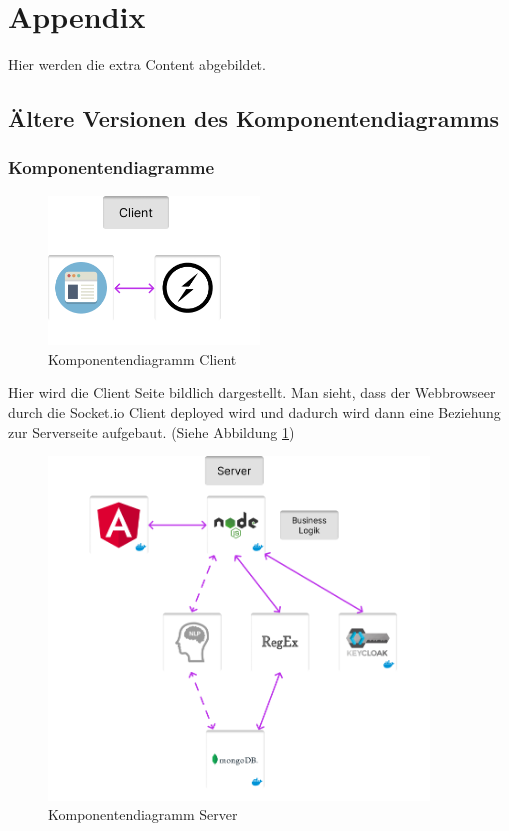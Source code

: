 \section{Appendix}
Hier werden die extra Content abgebildet.

\subsection{Ältere Versionen des Komponentendiagramms}

\subsubsection{Komponentendiagramme}

\begin{figure}[H]
\centering
\includegraphics[width=0.5\textwidth]{bilder/technologien/KomponentendiagramClient.png}
\caption{Komponentendiagramm Client}
\label{fig:Komponentendiagramm_Client}
\end{figure}
Hier wird die Client Seite bildlich dargestellt. Man sieht, dass der Webbrowseer durch die 
Socket.io Client deployed wird und dadurch wird dann eine Beziehung zur Serverseite aufgebaut. (Siehe Abbildung \ref{fig:Komponentendiagramm_Client})

\begin{figure}[H]
\centering
\includegraphics[width=0.9\textwidth]{bilder/technologien/KomponentendiagramServer.png}
\caption{Komponentendiagramm Server}
\label{fig:Komponentendiagramm_Server}
\end{figure}


